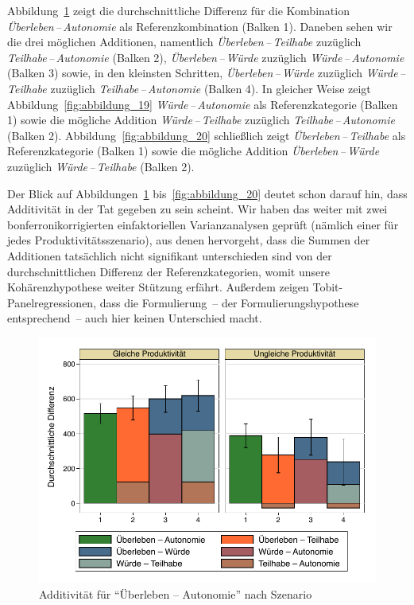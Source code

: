 \documentclass[justified,nobib,nohyper,symmetric,twoside]{tufte-book}
\begin{document}
Abbildung~\ref{fig:abbildung_18} zeigt die durchschnittliche Differenz für die Kombination \textit{Überleben\,--\,Autonomie} als Referenzkombination (Balken 1).
Daneben sehen wir die drei möglichen Additionen, namentlich \textit{\mbox{Überleben}\,--\,Teilhabe} zuzüglich \textit{Teilhabe\,--\,Autonomie} (Balken 2), \textit{Überleben\,--\,Würde} zuzüglich \textit{Würde\,--\,Autonomie} (Balken 3) sowie, in den kleinsten Schritten, \textit{Überleben\,--\,Würde} zuzüglich \textit{Würde\,--\,Teilhabe} zuzüglich \textit{Teilhabe\,--\,Autonomie} (Balken 4). In gleicher Weise zeigt Abbildung~\ref{fig:abbildung_19} \textit{Würde\,--\,Autonomie} als Referenzkategorie (Balken 1) sowie die mögliche Addition \textit{Würde\,--\,Teilhabe} zuzüglich \textit{Teilhabe\,--\,Autonomie} (Balken 2). Abbildung~\ref{fig:abbildung_20} schließlich zeigt \textit{Überleben\,--\,Teilhabe} als Referenzkategorie (Balken 1) sowie die mögliche Addition \textit{Überleben\,--\,Würde} zuzüglich \textit{Würde\,--\,Teilhabe} (Balken 2).

Der Blick auf Abbildungen~\ref{fig:abbildung_18} bis~\ref{fig:abbildung_20} deutet schon darauf hin, dass Additivität in der Tat gegeben zu sein scheint.
Wir haben das weiter mit zwei bonferronikorrigierten einfaktoriellen Varianzanalysen geprüft (nämlich einer für jedes Produktivitätsszenario), aus denen hervorgeht, dass die Summen der Additionen tatsächlich nicht signifikant unterschieden sind von der durchschnittlichen Differenz der Referenzkategorien, womit unsere Kohärenzhypothese weiter Stützung erfährt.
Außerdem zeigen Tobit-Panelregressionen, dass die Formulierung~-- der Formulierungshypothese entsprechend~-- auch hier keinen Unterschied macht.

\begin{figure}[t]\label{fig:abbildung_18}
   \center
   \caption{Additivität für \enquote{Überleben -- Autonomie} nach Szenario}
   \includegraphics[width=0.99\linewidth]{figure_18.pdf}
\end{figure}
\end{document}
